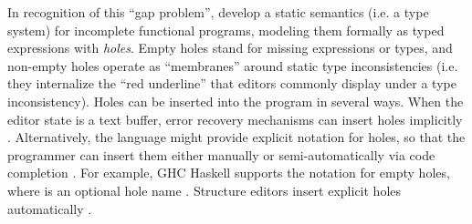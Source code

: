 In recognition of this ``{gap problem}'', \citet{popl-paper} develop a static semantics (i.e. a type system) for incomplete 
functional programs, modeling them formally as typed expressions with \emph{holes}. 
Empty holes stand for missing expressions or types,
and non-empty holes operate as ``membranes'' around static type inconsistencies 
(i.e. they internalize the ``red underline'' that editors commonly display under a type inconsistency).
Holes can be inserted into the program in several ways.
When the editor state is a text buffer, error recovery mechanisms can insert holes implicitly \cite{DBLP:journals/siamcomp/AhoP72,charles1991practical,DBLP:conf/oopsla/KatsJNV09}. 
Alternatively, the language might provide explicit notation for holes, so that the programmer can insert them either manually  
or semi-automatically via code completion \cite{Amorim2016}. For example, GHC Haskell supports the notation  for empty holes, where  is an optional hole name \cite{GHCHoles}. Structure editors insert explicit holes automatically \cite{popl-paper}.

